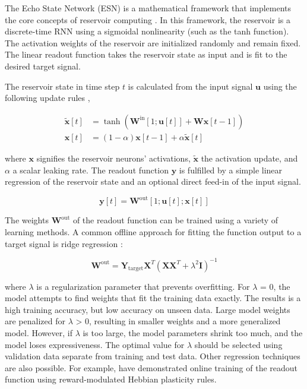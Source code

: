 
The Echo State Network (ESN) is a mathematical framework that implements the core concepts of reservoir computing \citep{jaeger_tutorial_2002}. 
In this framework, the reservoir is a discrete-time RNN using a sigmoidal nonlinearity (such as the tanh function). 
The activation weights of the reservoir are initialized randomly and remain fixed. 
The linear readout function takes the reservoir state as input and is fit to the desired target signal.

The reservoir state in time step $t$ is calculated from the input signal $\mathbf{u}$ using the following update rules \citep{lukosevicius_reservoir_2012},


\begin{align}
    \tilde{\mathbf{x}}[t] &= \tanh \left( \mathbf{W}^{\text{in}}[1;\mathbf{u}[t]] + \mathbf{W} \mathbf{x}[t-1] \right) \label{esn:update1} \\
    \mathbf{x}[t] &= (1-\alpha) \mathbf{x}[t-1] + \alpha \tilde{\mathbf{x}}[t] \label{esn:update2}
\end{align}


where $\mathbf{x}$ signifies the reservoir neurons' activations, $\mathbf{\tilde{x}}$ the activation update, and $\alpha$ a scalar leaking rate. The readout function $\mathbf{y}$ is fulfilled by a simple linear regression of the reservoir state and an optional direct feed-in of the input signal.

\begin{equation}
\mathbf{y}[t] = \mathbf{W}^{\text{out}}\left[1; \mathbf{u}[t];\mathbf{x}[t] \right] \label{esn:readout}
\end{equation}


The weights $\mathbf{W}^{\text{out}}$ of the readout function can be trained using a variety of learning methods. A common offline approach for fitting the function output to a target signal is ridge regression \citep{lukosevicius_reservoir_2012}:

\begin{equation}
    \mathbf{W}^{\text{out}} = \mathbf{Y}_{\text{target}}\mathbf{X}^{T} \left(\mathbf{X} \mathbf{X}^{T} + \lambda^{2} \mathbf{I} \right)^{-1} \label{esn:training}
\end{equation}

where $\lambda$ is a regularization parameter that prevents overfitting.
For $\lambda$ = 0, the model attempts to find weights that fit the training data exactly.
The results is a high training accuracy, but low accuracy on unseen data.
Large model weights are penalized for $\lambda$ > 0, resulting in smaller weights and a more generalized model.
However, if $\lambda$ is too large, the model parameters shrink too much, and the model loses expressiveness.
The optimal value for $\lambda$ should be selected using validation data separate from training and test data.
Other regression techniques are also possible.
For example, \citet{burms_reward-modulated_2015} have demonstrated online training of the readout function using reward-modulated Hebbian plasticity rules.
